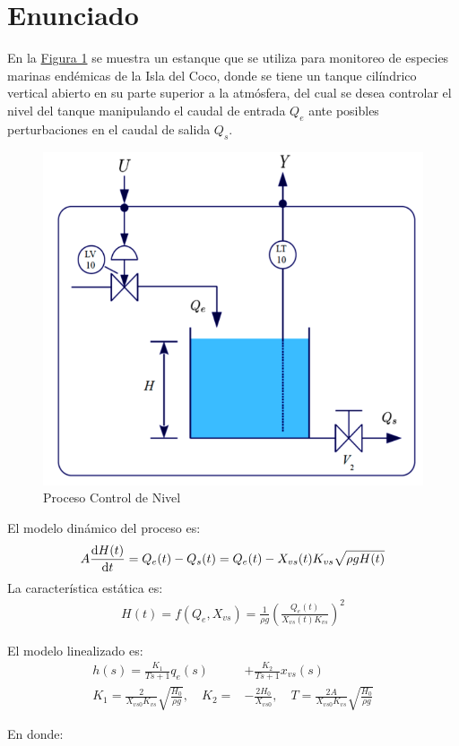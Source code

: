 \section{Enunciado}

\hspace{1.27cm} En la \hyperref[fig1]{Figura 1} se muestra un estanque que se utiliza para monitoreo de especies marinas
endémicas de la Isla del Coco, donde se tiene un tanque cilíndrico vertical abierto en su
parte superior a la atmósfera, del cual se desea controlar el nivel del tanque manipulando
el caudal de entrada $Q_e$ ante posibles perturbaciones en el caudal de salida $Q_s$.

\begin{figure}[!h]
    \centering
    \includegraphics[width = 0.4\linewidth]{figs/fig1.png}
    \caption{Proceso Control de Nivel}
    \label{fig1}
\end{figure}

El modelo dinámico del proceso es:
\begin{align*}
    A\dv{H(t)}{t} = Q_e(t) -Q_s(t) = Q_e(t) - X _{vs} (t) K _{vs} \sqrt{\rho g H(t)}
\end{align*}
La característica estática es:
\begin{align*}
    H(t) = f (Q_e, X _{vs}) = \frac{1}{\rho g} \left( \frac{Q_e(t)}{X _{vs} (t) K _{vs}} \right) ^{2}
\end{align*}

El modelo linealizado es:
\begingroup 
\addtolength\jot{6pt} 
\begin{align*}
    h (s) = \frac{K _{1}}{ Ts + 1} q _{e} (s) &+ \frac{K _{2}}{Ts + 1} x _{vs} (s)\\
    K _{1} = \frac{2}{X _{vs0} K _{vs}} \sqrt{ \frac{H_0}{\rho g}}, \quad K _{2} =& - \frac{2 H_0}{X _{vs0}}, \quad T = \frac{2A}{X _{vs0} K _{vs}} \sqrt{ \frac{H_0}{\rho g}}
\end{align*}

\newpage
En donde:

